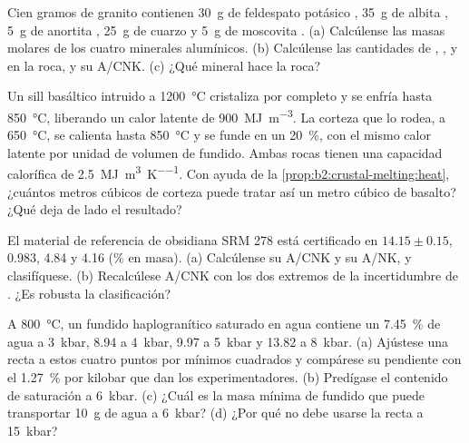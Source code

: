 \begin{exercise}[$\star\star$]\label{exo:b2:crustal-melting:6}
Cien gramos de granito contienen \qty{30}{\gram} de feldespato potásico ,
\qty{35}{\gram} de albita , \qty{5}{\gram} de anortita ,
\qty{25}{\gram} de cuarzo y \qty{5}{\gram} de moscovita .
(a) Calcúlense las masas molares de los cuatro minerales alumínicos. (b) Calcúlense las cantidades de
, ,  y  en la roca, y su A/CNK. (c) ¿Qué
mineral hace  la roca?
\end{exercise}

\begin{exercise}[$\star\star$]\label{exo:b2:crustal-melting:7}
Un sill basáltico intruido a \qty{1200}{\celsius} cristaliza por completo y se enfría hasta
\qty{850}{\celsius}, liberando un calor latente de \qty{900}{\mega\joule\per\cubic\metre}.
La corteza que lo rodea, a \qty{650}{\celsius}, se calienta hasta \qty{850}{\celsius} y
se funde en un \qty{20}{\percent}, con el mismo calor latente por unidad de volumen de fundido. Ambas
rocas tienen una capacidad calorífica de \qty{2.5}{\mega\joule\per\cubic\metre\per\kelvin}. Con ayuda de la
\cref{prop:b2:crustal-melting:heat}, ¿cuántos metros cúbicos de corteza puede tratar así un metro cúbico
de basalto? ¿Qué deja de lado el resultado?
\end{exercise}

\begin{exercise}[$\star\star$]\label{exo:b2:crustal-melting:8}
El material de referencia de obsidiana SRM 278 está certificado en 
$14.15 \pm 0.15$,  0.983,  4.84 y  4.16 (\unit{\percent} en
masa). (a) Calcúlense su A/CNK y su A/NK, y clasifíquese. (b) Recalcúlese A/CNK con los dos
extremos de la incertidumbre de . ¿Es robusta la clasificación?
\end{exercise}

\begin{exercise}[$\star\star$]\label{exo:b2:crustal-melting:9}
A \qty{800}{\celsius}, un fundido haplogranítico saturado en agua contiene un \qty{7.45}{\percent}
de agua a \qty{3}{kbar}, 8.94 a \qty{4}{kbar}, 9.97 a \qty{5}{kbar} y 13.82 a
\qty{8}{kbar}. (a) Ajústese una recta a estos cuatro puntos por mínimos cuadrados y compárese
su pendiente con el \qty{1.27}{\percent} por kilobar que dan los experimentadores.
(b) Predígase el contenido de saturación a \qty{6}{kbar}. (c) ¿Cuál es la masa mínima de fundido
que puede transportar \qty{10}{\gram} de agua a \qty{6}{kbar}? (d) ¿Por qué no debe
usarse la recta a \qty{15}{kbar}?
\end{exercise}

